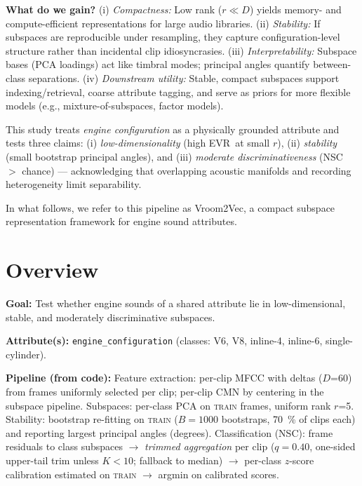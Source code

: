 \documentclass[11pt]{article}
\newcommand{\D}{\ensuremath{D}\xspace}
\newcommand{\rankr}{\ensuremath{r}\xspace}
\newcommand{\EVR}{EVR\xspace}
\newcommand{\NSC}{NSC\xspace}
\begin{document}
\textbf{What do we gain?} (i) \emph{Compactness:} Low rank (\rankr$\ll$\D) yields memory- and compute-efficient representations for large audio libraries. (ii) \emph{Stability:} If subspaces are reproducible under resampling, they capture configuration-level structure rather than incidental clip idiosyncrasies. (iii) \emph{Interpretability:} Subspace bases (PCA loadings) act like timbral modes; principal angles quantify between-class separations. (iv) \emph{Downstream utility:} Stable, compact subspaces support indexing/retrieval, coarse attribute tagging, and serve as priors for more flexible models (e.g., mixture-of-subspaces, factor models).

This study treats \emph{engine configuration} as a physically grounded attribute and tests three claims: (i) \emph{low-dimensionality} (high \EVR\ at small \rankr), (ii) \emph{stability} (small bootstrap principal angles), and (iii) \emph{moderate discriminativeness} (\NSC\ $>$ chance) --- acknowledging that overlapping acoustic manifolds and recording heterogeneity limit separability.

In what follows, we refer to this pipeline as Vroom2Vec, a compact subspace representation framework for engine sound attributes.

\section{Overview}

\textbf{Goal:} Test whether engine sounds of a shared attribute lie in low-dimensional, stable, and moderately discriminative subspaces.

\textbf{Attribute(s):} \texttt{engine\_configuration} (classes: V6, V8, inline-4, inline-6, single-cylinder).

\textbf{Pipeline (from code):} Feature extraction: per-clip MFCC with deltas (\D=60) from frames uniformly selected per clip; per-clip CMN by centering in the subspace pipeline. Subspaces: per-class PCA on \textsc{train} frames, uniform rank \rankr=5. Stability: bootstrap re-fitting on \textsc{train} ($B=1000$ bootstraps, \SI{70}{\percent} of clips each) and reporting largest principal angles (degrees). Classification (\NSC): frame residuals to class subspaces $\rightarrow$ \emph{trimmed aggregation} per clip ($q=0.40$, one-sided upper-tail trim unless $K<10$; fallback to median) $\rightarrow$ per-class $z$-score calibration estimated on \textsc{train} $\rightarrow$ argmin on calibrated scores.

\end{document}
